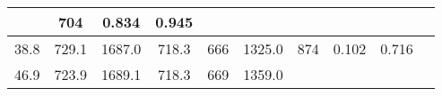 \documentclass[a4paper,10pt]{article}
\begin{document}
\begin{longtable}{
     |
%    
    c|
%    
    c|
%    
    c|
%    
    c|
%    
    c|
%    
    c|
%    
    c|
%    
    c|
%    
    c|
%    
    c|
%    
    }
%        
        & 704
%        

%        

%        
        & 0.834
%        

%        

%        
        & 0.945
%        

%        
        \\
        \hline

        

%        

%        
        38.8
%        

%        

%        
        & 729.1
%        

%        

%        
        & 1687.0
%        

%        

%        
        & 718.3
%        

%        

%        
        & 666
%        

%        

%        
        & 1325.0
%        

%        

%        
        & 874
%        

%        

%        
        & 0.102
%        

%        

%        
        & 0.716
%        

%        
        \\
        \hline

        

%        

%        
        46.9
%        

%        

%        
        & 723.9
%        

%        

%        
        & 1689.1
%        

%        

%        
        & 718.3
%        

%        

%        
        & 669
%        

%        

%        
        & 1359.0
%        

%        


\end{longtable}
\end{document}
